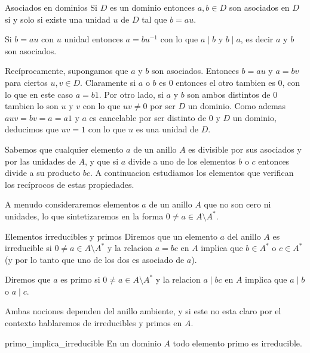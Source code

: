 \begin{lemma}{Asociados en dominios}{}
Si \(D\) es un dominio entonces \(a, b \in D\) son asociados en \(D\) si y solo si existe una unidad \(u\) de \(D\) tal que \(b = au\).
\end{lemma}

\begin{proofbox}
Si \(b = au\) con \(u\) unidad entonces \(a = bu^{-1}\) con lo que \(a \mid b\) y \(b \mid a\), es decir \(a\) y \(b\) son asociados. 

Recíprocamente, supongamos que \(a\) y \(b\) son asociados. Entonces \(b = au\) y \(a = bv\) para ciertos \(u, v \in D\). Claramente si \(a\) o \(b\) es 0 entonces el otro tambien es 0, con lo que en este caso \(a = b1\). Por otro lado, si \(a\) y \(b\) son ambos distintos de 0 tambien lo son \(u\) y \(v\) con lo que \(uv \neq 0\) por ser \(D\) un dominio. Como ademas \(auv = bv = a = a1\) y \(a\) es cancelable por ser distinto de 0 y \(D\) un dominio, deducimos que \(uv = 1\) con lo que \(u\) es una unidad de \(D\).
\end{proofbox}

Sabemos que cualquier elemento \(a\) de un anillo \(A\) es divisible por sus asociados y por las unidades de \(A\), y que si \(a\) divide a uno de los elementos \(b\) o \(c\) entonces divide a su producto \(bc\). A continuacion estudiamos los elementos que verifican los recíprocos de estas propiedades.

A menudo consideraremos elementos \(a\) de un anillo \(A\) que no son cero ni unidades, lo que sintetizaremos en la forma \(0 \neq a \in A \setminus A^*\).

\begin{definition}{Elementos irreducibles y primos}{}
Diremos que un elemento \(a\) del anillo \(A\) es irreducible si \(0 \neq a \in A \setminus A^*\) y la relacion \(a = bc\) en \(A\) implica que \(b \in A^*\) o \(c \in A^*\) (y por lo tanto que uno de los dos es asociado de \(a\)).

Diremos que \(a\) es primo si \(0 \neq a \in A \setminus A^*\) y la relacion \(a \mid bc\) en \(A\) implica que \(a \mid b\) o \(a \mid c\).

Ambas nociones dependen del anillo ambiente, y si este no esta claro por el contexto hablaremos de irreducibles y primos en \(A\).
\end{definition}

\begin{proposition}{}{primo_implica_irreducible}
En un dominio \(A\) todo elemento primo es irreducible.
\end{proposition}

